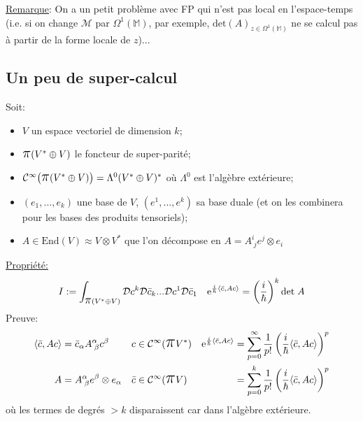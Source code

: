 \documentclass[a4paper,11pt]{article}
\newcommand{\D}{{\mathcal{D}}}
\newcommand{\e}{{\mathrm{e}}}
\newcommand{\ppi}{{\mathlarger{\mathlarger{\mathlarger{\pi}}}}}
\begin{document}
\underline{Remarque}: On a un petit problème avec FP qui n'est pas local en l'espace-temps (i.e. si on change $\mathcal M$ par $\Omega^1(\mathbb M)$, par exemple, $\mathrm{det}(A)_{z\in\Omega^1(\mathbb M)}$ ne se calcul pas à partir de la forme locale de $z$)...
\subsection{Un peu de super-calcul}
Soit:
\begin{itemize}
\item $V$ un espace vectoriel de dimension $k$;
\item $\ppi(V^*\oplus V)$ le foncteur de super-parité;
\item $\mathcal{C}^\infty\big(\ppi(V^*\oplus V)\big) = \Lambda^0(V^*\oplus V)^*$ où $\Lambda^0$ est l'algèbre extérieure;
\item $(e_1, ..., e_k)$ une base de $V$, $(e^1, ..., e^k)$ sa base duale (et on les combinera pour les bases des produits tensoriels);
\item $A\in \mathrm{End}(V)\approx V\otimes V^*$ que l'on décompose en $A=A^i_{\;j}e^j\otimes e_i$
\end{itemize}
\underline{Propriété:}
$$
I:= \int_{\ppi(V^*\oplus V)}\D c^k \D \Bar c_k ... \D c^1 \D \Bar c_1 \quad \e^{\frac i \hbar \langle \Bar c, A c \rangle}
= \left(\frac{i}{\hbar}\right)^k \mathrm{det} \; A
$$
Preuve:
\begin{align*}
\langle \bar c, A c \rangle &= \bar c_\alpha A^\alpha_{\;\beta} c^\beta &
c &\in \mathcal{C}^\infty(\ppi V^*) &
\e^{\frac i \hbar \langle\bar c, A c\rangle} &= \sum_{p=0}^\infty \frac{1}{p!}\left(\frac{i}{\hbar}\langle\bar c, Ac\rangle\right)^p\\
A &= A^\alpha_{\;\beta} e^\beta\otimes e_\alpha&
\bar c &\in \mathcal{C}^\infty(\ppi V)&
&=\sum_{p=0}^k \frac{1}{p!}\left(\frac{i}{\hbar}\langle\bar c, Ac\rangle\right)^p
\end{align*}
où les termes de degrés $>k$ disparaissent car dans l'algèbre extérieure.
\end{document}
